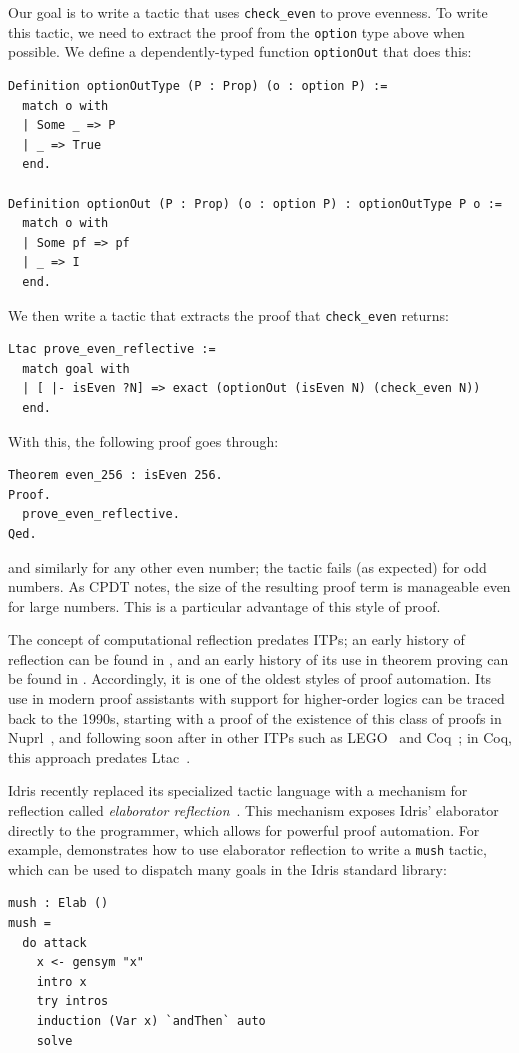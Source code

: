 Our goal is to write a tactic that uses \lstinline{check_even} to prove evenness.
To write this tactic, we need to extract the proof from the \lstinline{option} type above 
when possible. We define a dependently-typed function \lstinline{optionOut}
that does this:
\begin{lstlisting}
Definition optionOutType (P : Prop) (o : option P) := 
  match o with
  | Some _ => P
  | _ => True
  end.

Definition optionOut (P : Prop) (o : option P) : optionOutType P o := 
  match o with
  | Some pf => pf
  | _ => I
  end.
\end{lstlisting}
We then write a tactic that extracts the proof that \lstinline{check_even} returns:
\begin{lstlisting}
Ltac prove_even_reflective := 
  match goal with
  | [ |- isEven ?N] => exact (optionOut (isEven N) (check_even N))
  end.
\end{lstlisting}
With this, the following proof goes through:
\begin{lstlisting}
Theorem even_256 : isEven 256.
Proof.
  prove_even_reflective.
Qed.
\end{lstlisting}
and similarly for any other even number; the tactic fails (as expected) for odd numbers.
As CPDT notes, the size of the resulting proof term is manageable even for large numbers.
This is a particular advantage of this style of proof.

The concept of computational reflection predates ITPs;
an early history of reflection can be found in \cite{Demers95reflectionin},
and an early history of its use in theorem proving can be found in \cite{harrison-reflection}.
Accordingly, it is one of the oldest styles of proof automation.
Its use in modern proof assistants with support for higher-order logics can be traced back to the 1990s, 
starting with a proof of the existence of this class of proofs in Nuprl~\citep{Allen1990},
and following soon after in other ITPs such as LEGO~\citep{Pollack1994} and Coq~\citep{Boutin1997}; 
in Coq, this approach predates Ltac~\citep{Delahaye2000}. %

Idris recently replaced its specialized tactic language with a mechanism for reflection called \textit{elaborator reflection}~\citep{Christiansen2016}.
This mechanism exposes Idris' elaborator directly to the programmer, 
which allows for powerful proof automation. For example, \cite{Christiansen2016} demonstrates how to use
elaborator reflection to write a \lstinline{mush} tactic, which can be used to dispatch many goals in the Idris standard library:
\begin{lstlisting}
mush : Elab ()
mush =
  do attack
    x <- gensym "x"
    intro x
    try intros
    induction (Var x) `andThen` auto
    solve
\end{lstlisting} %

